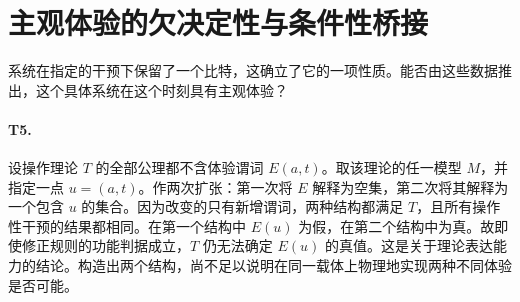 \section{主观体验的欠决定性与条件性桥接}
\label{sec:boundary}
系统在指定的干预下保留了一个比特，这确立了它的一项性质。能否由这些数据推出，这个具体系统在这个时刻具有主观体验？

\paragraph{T5.} 设操作理论 $T$ 的全部公理都不含体验谓词 $E(a,t)$。取该理论的任一模型 $M$，并指定一点 $u=(a,t)$。作两次扩张：第一次将 $E$ 解释为空集，第二次将其解释为一个包含 $u$ 的集合。因为改变的只有新增谓词，两种结构都满足 $T$，且所有操作性干预的结果都相同。在第一个结构中 $E(u)$ 为假，在第二个结构中为真。故即使修正规则的功能判据成立，$T$ 仍无法确定 $E(u)$ 的真值。这是关于理论表达能力的结论。构造出两个结构，尚不足以说明在同一载体上物理地实现两种不同体验是否可能。

